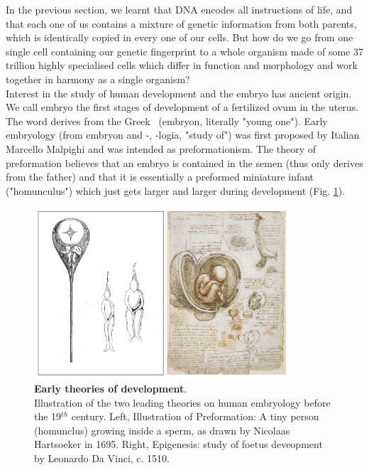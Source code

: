 In the previous section, we learnt that DNA encodes all instructions of life, and that each one of us contains a mixture of genetic information from both parents, which is identically copied in every one of our cells.
But how do we go from one single cell containing our genetic fingerprint to a whole organism made of some 37 trillion highly specialised cells which differ in function and morphology and work together in harmony as a single organism?\\

Interest in the study of human development and the embryo has ancient origin.
We call embryo the first stages of development of a fertilized ovum in the uterus.
The word derives from 
the Greek \textepsilon\textmu\textbeta\textrho\textupsilon\textomikron\textnu \ (embryon, literally "young one").
Early embryology (from embryon and -\textlambda\textomikron\textgamma\textiota\textalpha, -logia, "study of") was first proposed by Italian Marcello Malpighi and was intended as preformationism.
The theory of preformation believes that an embryo is contained in the semen (thus only derives from the father) and that it is essentially a preformed miniature infant ("homunculus") which just gets larger and larger during development (Fig. \ref{fig:early_embryology}).\\

\begin{figure}
\includegraphics[width=9.5cm]{Chapter1/Fig/Early_theories_development.png}
\caption[Early theories of development]{\textbf{Early theories of development}.\\
Illustration of the two leading theories on human embryology before the 19$^{th}$ century.
Left, Illustration of Preformation: 
A tiny person (homunclus) growing inside a sperm, as drawn by Nicolaas Hartsoeker in 1695.
Right, Epigenesis: study of foetus deveopment by Leonardo Da Vinci, c. 1510.}
\label{fig:early_embryology}
\end{figure}

